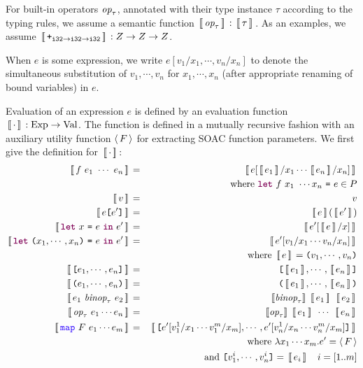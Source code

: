 \documentclass[oneside,11pt]{book}
\begin{document}
For built-in operators $\mbox{\it{op}}_\tau$, annotated with their type
instance $\tau$ according to the typing rules, we assume a semantic
function $\,[\![\,\mbox{\it{op}}_\tau\,]\!]\, : \,[\![\,\tau\,]\!]\,$. As an examples, we assume
$\,[\![\,\texttt{+}_{\texttt{i32}\rightarrow\texttt{i32}\rightarrow\texttt{i32}}\,]\!]\, : Z \rightarrow Z \rightarrow Z$.

When $e$ is some expression, we write $e[v_1/x_1,\cdots,v_n/x_n]$ to
denote the simultaneous substitution of $v_1,\cdots,v_n$ for
$x_1,\cdots,x_n$ (after appropriate renaming of bound variables) in
$e$.



Evaluation of an expression $e$ is defined by an evaluation function
$\,[\![\,\cdot\,]\!]\, : \mathrm{Exp} \rightarrow \mathrm{Val}$. The function
is defined in a mutually recursive fashion with an auxiliary utility
function $\langle\,F\,\rangle$ for extracting SOAC function parameters. We
first give the definition for $\,[\![\,\cdot\,]\!]\,$:
\begin{eqnarray*}
  \Eval{f~e_1~\cdots~e_n} & = & \Eval{e[\Eval{e_1}/x_1\cdots \Eval{e_n}/x_n]} \\ & & ~~~ \mathrm{where}~\fw{let}~f~x_1~ \cdots x_n ~\kw{=}~ e \in P \\
  \Eval{v} & = & v \\
  \Eval{e\kw{[}e'\kw{]}} & = & \Eval{e}(\Eval{e'}) \\
  \Eval{\fw{let}~x~\kw{=}~e~\fw{in}~e'} & = & \Eval{e'[\Eval{e}/x]} \\
  \Eval{\fw{let}~\kw{(}x_1,\cdots,x_n\kw{)}~\kw{=}~e~\fw{in}~e'} & = & \Eval{e'[v_1/x_1\cdots v_n/x_n]} \\ & & ~~~ \mathrm{where}~ \Eval{e} = \kw{(}v_1,\cdots,v_n\kw{)} \\
  \Eval{\kw{[}e_1,\cdots,e_n\kw{]}} & = & \kw{[}\Eval{e_1},\cdots,\Eval{e_n}\kw{]} \\
  \Eval{\kw{(}e_1,\cdots,e_n\kw{)}} & = & \kw{(}\Eval{e_1},\cdots,\Eval{e_n}\kw{)} \\
  \Eval{e_1~\id{binop}_\tau~e_2} & = & \sem{\id{binop}_\tau}~\Eval{e_1}~\Eval{e_2} \\
  \Eval{\id{op}_\tau~e_1\cdots e_n} & = & \sem{\id{op}_\tau}~\Eval{e_1}~\cdots~\Eval{e_n} \\
  \Eval{\fop{map}~F~e_1\cdots e_m} & = & \Eval{\kw{[}e'[v_1^1/x_1\cdots v_1^m/x_m],\cdots,e'[v_n^1/x_n\cdots v_n^m/x_m]\kw{]}} \\
    & & ~~~\mathrm{where}~\lambda x_1\cdots x_m . e' = \extractF{F} \\
    & & ~~~~~\mathrm{and}~ \kw{[}v_1^i,\cdots,v_n^i\kw{]} = \Eval{e_i} ~~~ i=[1..m]
\end{eqnarray*}
\end{document}
